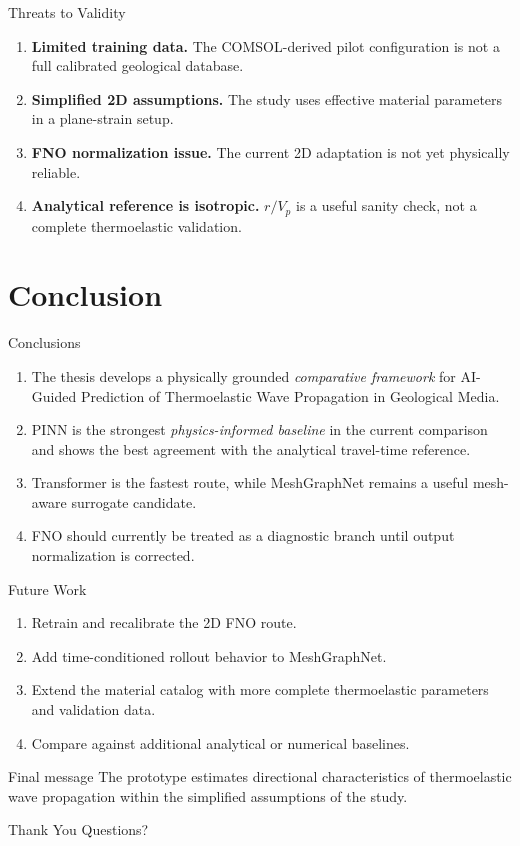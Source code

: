 \documentclass[aspectratio=169,10pt]{beamer}
\begin{document}
\begin{frame}{Threats to Validity}
  \begin{enumerate}
    \item \textbf{Limited training data.}
          The COMSOL-derived pilot configuration is not a full calibrated
          geological database.
    \item \textbf{Simplified 2D assumptions.}
          The study uses effective material parameters in a plane-strain setup.
    \item \textbf{FNO normalization issue.}
          The current 2D adaptation is not yet physically reliable.
    \item \textbf{Analytical reference is isotropic.}
          $r/V_p$ is a useful sanity check, not a complete thermoelastic validation.
  \end{enumerate}
\end{frame}

\section{Conclusion}

\begin{frame}{Conclusions}
  \begin{enumerate}
    \item The thesis develops a physically grounded
          \emph{comparative framework} for
          AI-Guided Prediction of Thermoelastic Wave Propagation in Geological Media.
    \item PINN is the strongest \emph{physics-informed baseline} in the
          current comparison and shows the best agreement with the analytical
          travel-time reference.
    \item Transformer is the fastest route, while MeshGraphNet remains a
          useful mesh-aware surrogate candidate.
    \item FNO should currently be treated as a diagnostic branch until
          output normalization is corrected.
  \end{enumerate}
\end{frame}

\begin{frame}{Future Work}
  \begin{enumerate}
    \item Retrain and recalibrate the 2D FNO route.
    \item Add time-conditioned rollout behavior to MeshGraphNet.
    \item Extend the material catalog with more complete thermoelastic
          parameters and validation data.
    \item Compare against additional analytical or numerical baselines.
  \end{enumerate}
  \vskip 8pt
  \begin{exampleblock}{Final message}
    The prototype estimates directional characteristics of thermoelastic
    wave propagation within the simplified assumptions of the study.
  \end{exampleblock}
\end{frame}

\begin{frame}{Thank You}
  \centering
  \Large Questions?
\end{frame}
\end{document}
